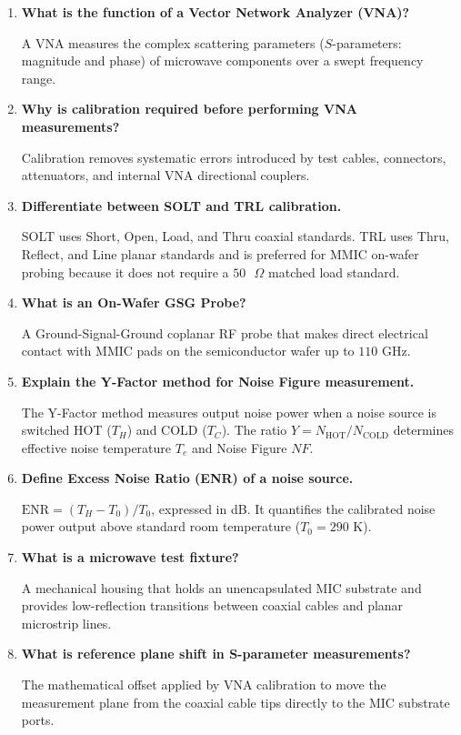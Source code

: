\documentclass[10pt,a4paper]{article}
\newcommand{\Q}[1]{\textbf{#1}\par\vspace{2pt}}
\begin{document}
\begin{tcolorbox}[exambox, title={\textbf{Frequently Asked / Viva Questions}}]
  \begin{enumerate}[topsep=0pt, label=\textbf{Q\arabic*.}, itemsep=5pt]
    \item \Q{What is the function of a Vector Network Analyzer (VNA)?}
    A VNA measures the complex scattering parameters ($S$-parameters: magnitude and phase) of microwave components over a swept frequency range.

    \item \Q{Why is calibration required before performing VNA measurements?}
    Calibration removes systematic errors introduced by test cables, connectors, attenuators, and internal VNA directional couplers.

    \item \Q{Differentiate between SOLT and TRL calibration.}
    SOLT uses Short, Open, Load, and Thru coaxial standards. TRL uses Thru, Reflect, and Line planar standards and is preferred for MMIC on-wafer probing because it does not require a $50\text{ }\Omega$ matched load standard.

    \item \Q{What is an On-Wafer GSG Probe?}
    A Ground-Signal-Ground coplanar RF probe that makes direct electrical contact with MMIC pads on the semiconductor wafer up to $110\text{ GHz}$.

    \item \Q{Explain the Y-Factor method for Noise Figure measurement.}
    The Y-Factor method measures output noise power when a noise source is switched HOT ($T_H$) and COLD ($T_C$). The ratio $Y = N_{\text{HOT}}/N_{\text{COLD}}$ determines effective noise temperature $T_e$ and Noise Figure $NF$.

    \item \Q{Define Excess Noise Ratio (ENR) of a noise source.}
    $\text{ENR} = (T_H - T_0)/T_0$, expressed in dB. It quantifies the calibrated noise power output above standard room temperature ($T_0 = 290\text{ K}$).

    \item \Q{What is a microwave test fixture?}
    A mechanical housing that holds an unencapsulated MIC substrate and provides low-reflection transitions between coaxial cables and planar microstrip lines.

    \item \Q{What is reference plane shift in S-parameter measurements?}
    The mathematical offset applied by VNA calibration to move the measurement plane from the coaxial cable tips directly to the MIC substrate ports.


\end{enumerate}
\end{tcolorbox}
\end{document}
